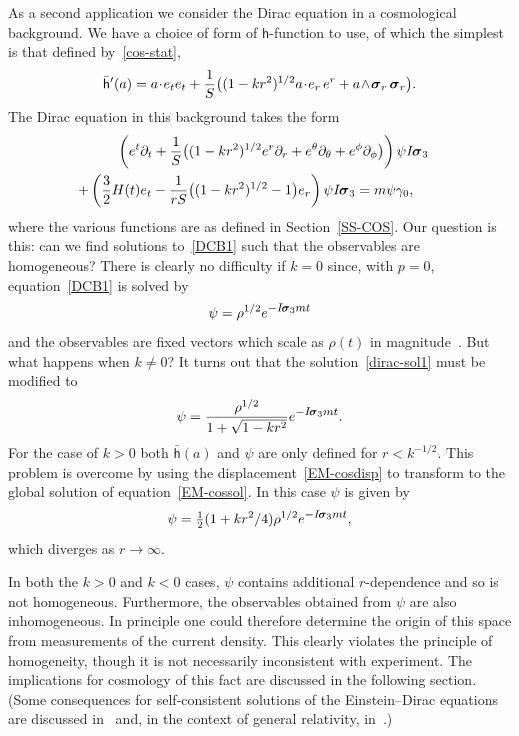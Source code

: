 \documentclass[a4paper]{article}
\numberwithin{equation}{section}
\newcommand{\et}[1]{e^{\mbox{\footnotesize $#1$}}}
\newcommand{\dt}{\! \cdot \!}
\newcommand{\wdg}{\! \wedge \!}
\newcommand{\half}{{\textstyle \frac{1}{2}}}
\newcommand{\sig}{\mbox{\boldmath $\sigma$}}
\newcommand{\bsig}{\mbox{\boldmath $\sig$}}
\newcommand{\dr}{\partial_r}
\newcommand{\isk}{I \hspace{-1pt} \bsig_3}
\newcommand{\go}{\gamma_{0}}
\newcommand{\sigr}{\bsig_r}
\newcommand{\lih}{\mathsf{h}}
\newcommand{\lbh}{\bar{\mathsf{h}}}
\newcommand{\ho}{\lbh}
\begin{document}
As a second application we consider the Dirac equation in a
cosmological background.  We have a choice of form of
$\lih$-function to use, of which the simplest is that defined
by~\eqref{cos-stat}, 
%
\begin{equation}
\ho'(a) = a \dt e_t e_t + \frac{1}{S} \bigl( (1-kr^2)^{1/2} a \dt e_r
\, e^r + a \wdg \sigr \, \sigr \bigr).
\end{equation}
%
The Dirac equation in this background takes the form
%
\begin{multline}
\qquad
\left( e^t \partial_t + \frac{1}{S} \bigl( (1-kr^2)^{1/2} e^r \dr + e^\theta
\partial_\theta + e^\phi \partial_\phi \bigr) \right) \psi \isk \\
+ \left( \frac{3}{2} H(t) e_t - \frac{1}{rS}\bigl((1-kr^2)^{1/2} -1 \bigr)
e_r \right) \psi \isk = m \psi \go, \qquad
\label{DCB1}
\end{multline}
%
where the various functions are as defined in Section~\ref{SS-COS}.
Our question is this: can we find solutions to~\eqref{DCB1} such that the
observables are homogeneous?  There is clearly no difficulty if $k=0$
since, with $p=0$, equation~\eqref{DCB1} is solved by 
%
\begin{equation}
\psi = \rho^{1/2} \et{-\isk mt}
\label{dirac-sol1}
\end{equation} 
%
and the observables are fixed vectors which scale as $\rho(t)$ in
magnitude~\cite{DGL-cosm-bel}.  But what happens when $k\neq 0$?  It
turns out that the solution~\eqref{dirac-sol1} must be modified
to~\cite{DGL-cosm-bel}
%
\begin{equation}
\psi = \frac{\rho^{1/2}}{1+ \sqrt{1-kr^2}} \et{-\isk mt}.
\label{dirac-sol2}
\end{equation} 
%
For the case of $k>0$ both $\ho(a)$ and $\psi$ are only defined for
$r<k^{-1/2}$.  This problem is overcome by using the
displacement~\eqref{EM-cosdisp} to transform to the global solution of
equation~\eqref{EM-cossol}.  In this case $\psi$ is given by
%
\begin{equation}
\psi = \half (1+ k r^2 /4) \rho^{1/2} \et{-\isk mt},
\end{equation} 
%
which diverges as $r\rightarrow\infty$.


In both the $k>0$ and $k<0$ cases, $\psi$ contains additional
$r$-dependence and so is not homogeneous.  Furthermore, the
observables obtained from $\psi$ are also inhomogeneous.  In principle
one could therefore determine the origin of this space from
measurements of the current density.  This clearly violates the
principle of homogeneity, though it is not necessarily inconsistent
with experiment.  The implications for cosmology of this fact are
discussed in the following section.  (Some consequences for
self-consistent solutions of the Einstein--Dirac equations are
discussed in~\cite{DGL-cosm-bel,DGL97-selfcons} and, in the context of
general relativity, in~\cite{ish74}.)
\end{document}
